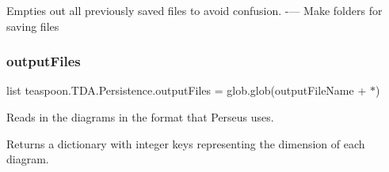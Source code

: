 Empties out all previously saved files to avoid confusion. -\/--- Make folders for saving files \mbox{\label{namespaceteaspoon_1_1_t_d_a_1_1_persistence_ae41c85513e98b32d96c75124929c4d2c}}
\subsubsection{\texorpdfstring{output\+Files}{outputFiles}}
{\footnotesize\ttfamily list teaspoon.\+T\+D\+A.\+Persistence.\+output\+Files = glob.\+glob(output\+File\+Name + \textquotesingle{}$\ast$\textquotesingle{})}



Reads in the diagrams in the format that Perseus uses.

Returns a dictionary with integer keys representing the dimension of each diagram.
